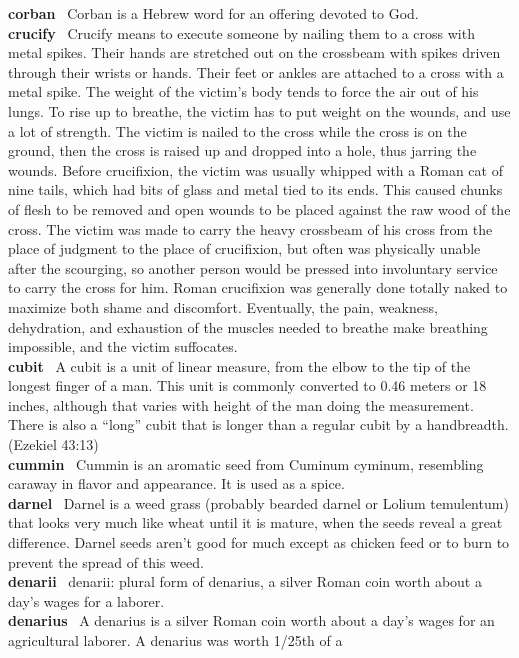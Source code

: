 \textbf{corban}~ Corban is a Hebrew word for an offering devoted to
God.\\
\textbf{crucify}~ Crucify means to execute someone by nailing them to a
cross with metal spikes. Their hands are stretched out on the crossbeam
with spikes driven through their wrists or hands. Their feet or ankles
are attached to a cross with a metal spike. The weight of the victim's
body tends to force the air out of his lungs. To rise up to breathe, the
victim has to put weight on the wounds, and use a lot of strength. The
victim is nailed to the cross while the cross is on the ground, then the
cross is raised up and dropped into a hole, thus jarring the wounds.
Before crucifixion, the victim was usually whipped with a Roman cat of
nine tails, which had bits of glass and metal tied to its ends. This
caused chunks of flesh to be removed and open wounds to be placed
against the raw wood of the cross. The victim was made to carry the
heavy crossbeam of his cross from the place of judgment to the place of
crucifixion, but often was physically unable after the scourging, so
another person would be pressed into involuntary service to carry the
cross for him. Roman crucifixion was generally done totally naked to
maximize both shame and discomfort. Eventually, the pain, weakness,
dehydration, and exhaustion of the muscles needed to breathe make
breathing impossible, and the victim suffocates.\\
\textbf{cubit}~ A cubit is a unit of linear measure, from the elbow to
the tip of the longest finger of a man. This unit is commonly converted
to 0.46 meters or 18 inches, although that varies with height of the man
doing the measurement. There is also a ``long'' cubit that is longer
than a regular cubit by a handbreadth. (Ezekiel 43:13)\\
\textbf{cummin}~ Cummin is an aromatic seed from Cuminum cyminum,
resembling caraway in flavor and appearance. It is used as a spice.\\
\textbf{darnel}~ Darnel is a weed grass (probably bearded darnel or
Lolium temulentum) that looks very much like wheat until it is mature,
when the seeds reveal a great difference. Darnel seeds aren't good for
much except as chicken feed or to burn to prevent the spread of this
weed.\\
\textbf{denarii}~ denarii: plural form of denarius, a silver Roman coin
worth about a day's wages for a laborer.\\
\textbf{denarius}~ A denarius is a silver Roman coin worth about a day's
wages for an agricultural laborer. A denarius was worth 1/25th of a
